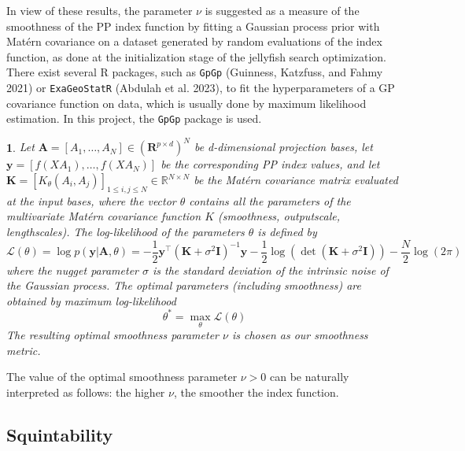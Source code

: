 \documentclass[
  12pt,
]{interact}
\theoremstyle{plain}
\newtheorem{defn}{\protect\definitionname}
\providecommand{\definitionname}{Definition}
\begin{document}
In view of these results, the parameter \(\nu\) is suggested as a
measure of the smoothness of the PP index function by fitting a Gaussian
process prior with Matérn covariance on a dataset generated by random
evaluations of the index function, as done at the initialization stage
of the jellyfish search optimization. There exist several R packages,
such as \texttt{GpGp} (Guinness, Katzfuss, and Fahmy 2021) or
\texttt{ExaGeoStatR} (Abdulah et al. 2023), to fit the hyperparameters
of a GP covariance function on data, which is usually done by maximum
likelihood estimation. In this project, the \texttt{GpGp} package is
used.

\begin{defn}
Let $\mathbf{A}=[A_1, \ldots, A_N] \in (\mathbf{R}^{p \times d})^N$ be d-dimensional projection bases, let $\mathbf{y}=[f(XA_1),\ldots,f(XA_N)]$ be the corresponding PP index values, and let $\mathbf{K}=[K_\theta(A_{i},A_{j})]_{1\leq i,j\leq N}\in\mathbb{R}^{N\times N}$ be the Matérn covariance matrix evaluated at the input bases, where the vector $\theta$ contains all the parameters of the multivariate Matérn covariance function $K$ (smoothness, outputscale, lengthscales). The log-likelihood of the parameters $\theta$ is defined by 
\begin{equation}
\mathcal{L}(\theta)=\log p(\mathbf{y}\left|\mathbf{A},\theta\right.)=-\frac{1}{2}\mathbf{y}^{\top}(\mathbf{K}+\sigma^{2}\mathbf{I})^{-1}\mathbf{y}-\frac{1}{2}\mathrm{\log}(\det(\mathbf{K}+\sigma^{2}\mathbf{I}))-\frac{N}{2}\log(2\pi)\, \label{eq:gp_log_likelihood}
\end{equation}
where the nugget parameter $\sigma$ is the standard deviation of the intrinsic noise of the Gaussian process.
The optimal parameters (including smoothness) are obtained by maximum log-likelihood
\begin{equation}
\theta^* = \underset{\theta}{\max}\mathcal{L}(\theta)
\end{equation}
The resulting optimal smoothness parameter $\nu$ is chosen as our smoothness metric.
\end{defn}

The value of the optimal smoothness parameter \(\nu>0\) can be naturally
interpreted as follows: the higher \(\nu\), the smoother the index
function.

\subsection{Squintability}\label{sec-squintability}
\end{document}
